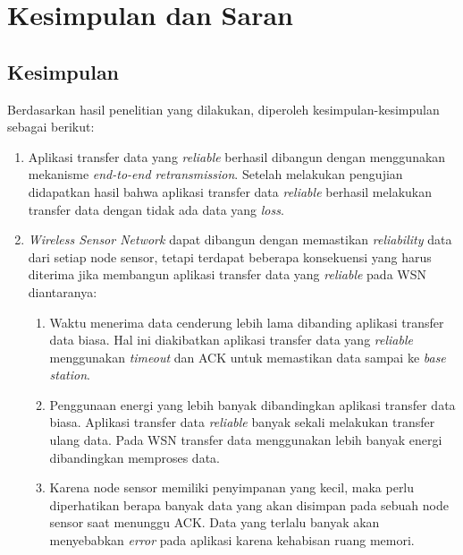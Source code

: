 \chapter{Kesimpulan dan Saran}
\label{chap:kesimpulan_dan_saran}

\section{Kesimpulan}
\label{sec:kesimpulan}
Berdasarkan hasil penelitian yang dilakukan, diperoleh kesimpulan-kesimpulan sebagai berikut:

\begin{enumerate}
    \item Aplikasi transfer data yang \textit{reliable} berhasil dibangun dengan menggunakan mekanisme \textit{end-to-end retransmission}. Setelah melakukan pengujian didapatkan hasil bahwa aplikasi transfer data \textit{reliable} berhasil melakukan transfer data dengan tidak ada data yang \textit{loss}. 
    \item \textit{Wireless Sensor Network} dapat dibangun dengan memastikan \textit{reliability} data dari setiap node sensor, tetapi terdapat beberapa konsekuensi yang harus diterima jika membangun aplikasi transfer data yang \textit{reliable} pada WSN diantaranya:
    \begin{enumerate}
        \item Waktu menerima data cenderung lebih lama dibanding aplikasi transfer data biasa. Hal ini diakibatkan aplikasi transfer data yang \textit{reliable} menggunakan \textit{timeout} dan ACK untuk memastikan data sampai ke \textit{base station}.
        \item Penggunaan energi yang lebih banyak dibandingkan aplikasi transfer data biasa. Aplikasi transfer data \textit{reliable} banyak sekali melakukan transfer ulang data. Pada WSN transfer data menggunakan lebih banyak energi dibandingkan memproses data.
        \item Karena node sensor memiliki penyimpanan yang kecil, maka perlu diperhatikan berapa banyak data yang akan disimpan pada sebuah node sensor saat menunggu ACK. Data yang terlalu banyak akan menyebabkan \textit{error} pada aplikasi karena kehabisan ruang memori.
    \end{enumerate}
\end{enumerate}
